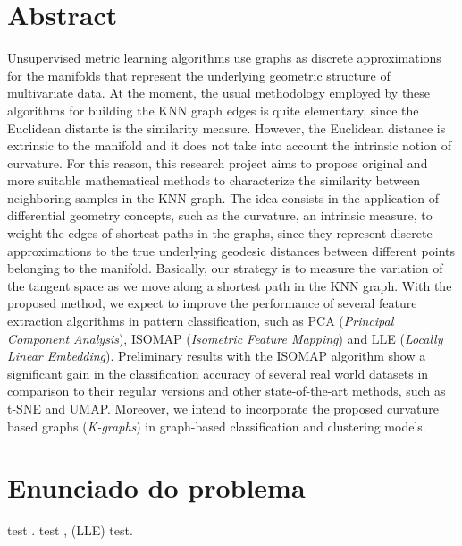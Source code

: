 \documentclass[a4paper, 12pt]{article}
\begin{document}
\section*{Abstract}
\noindent
Unsupervised metric learning algorithms use graphs as discrete approximations for the manifolds that represent the underlying geometric structure of multivariate data. At the moment, the usual methodology employed by these algorithms for building the KNN graph edges is quite elementary, since the Euclidean distante is the similarity measure. However, the Euclidean distance is extrinsic to the manifold and it does not take into account the intrinsic notion of curvature. For this reason, this research project aims to propose original and more suitable mathematical methods to characterize the similarity between neighboring samples in the KNN graph. The idea consists in the application of differential geometry concepts, such as the curvature, an intrinsic measure, to weight the edges of shortest paths in the graphs, since they represent discrete approximations to the true underlying geodesic distances between different points belonging to the manifold. Basically, our strategy is to measure the variation of the tangent space as we move along a shortest path in the KNN graph. With the proposed method, we expect to improve the performance of several feature extraction algorithms in pattern classification, such as PCA (\emph{Principal Component Analysis}), ISOMAP (\emph{Isometric Feature Mapping}) and LLE (\emph{Locally Linear Embedding}). Preliminary results with the ISOMAP algorithm show a significant gain in the classification accuracy of several real world datasets in comparison to their regular versions and other state-of-the-art methods, such as t-SNE and UMAP. Moreover, we intend to incorporate the proposed curvature based graphs (\emph{K-graphs}) in graph-based classification and clustering models.

\newpage

\section{Enunciado do problema}
test \cite{Seung,Brand,Cayton,Huo2007,Advances,Diffusion1}. test \cite{Isomap,Isomap_converg},  (LLE) \cite{LLE,LLE2,LLE3,LLE4, LLE5} test\cite{LapEig,SurveyLE}. 
\newpage 



\end{document}
